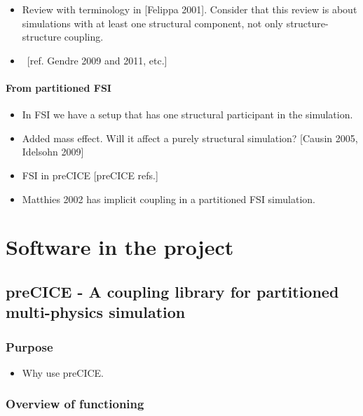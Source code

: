 \documentclass[a4paper, 11pt, oneside]{Thesis}  %
\begin{document}
            \begin{itemize}
                \item Review with terminology in [Felippa 2001]. Consider that this review is about simulations with at least one structural component, not only structure-structure coupling.
                \item ~[ref. Gendre 2009 and 2011, etc.]
            \end{itemize}
            
            \subsubsection{From partitioned FSI}
                \begin{itemize}
                    \item In FSI we have a setup that has one structural participant in the simulation.
                    \item Added mass effect. Will it affect a purely structural simulation? [Causin 2005, Idelsohn 2009]
                    \item FSI in preCICE [preCICE refs.]
                    \item Matthies 2002 has implicit coupling in a partitioned FSI simulation.
                \end{itemize}
            
\chapter{Software in the project}

    \section{preCICE - A coupling library for partitioned multi-physics simulation}
        
        \subsection{Purpose}
        
        \begin{itemize}
            \item Why use preCICE.
        \end{itemize}
        
        \subsection{Overview of functioning}
        
\end{document}
